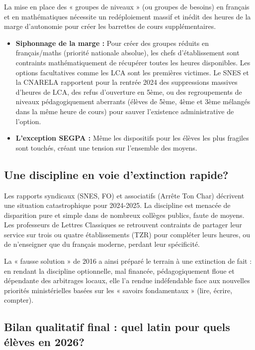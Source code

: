 La mise en place des « groupes de niveaux » (ou groupes de besoins) en français et en mathématiques
nécessite un redéploiement massif et inédit des heures de la marge d'autonomie pour créer les
barrettes de cours supplémentaires.

\begin{itemize}\item \textbf{Siphonnage de la marge :} Pour créer des groupes réduits en français/maths (priorité nationale absolue), les chefs d'établissement sont contraints mathématiquement de récupérer toutes les heures disponibles. Les options facultatives comme les LCA sont les premières victimes. Le SNES et la CNARELA rapportent pour la rentrée 2024 des suppressions massives d'heures de LCA, des refus d'ouverture en 5ème, ou des regroupements de niveaux pédagogiquement aberrants (élèves de 5ème, 4ème et 3ème mélangés dans la même heure de cours) pour sauver l'existence administrative de l'option.\cite{I-3-2-ref2}\item \textbf{L'exception SEGPA :} Même les dispositifs pour les élèves les plus fragiles sont touchés, créant une tension sur l'ensemble des moyens.\cite{I-3-2-ref39}\end{itemize}

\subsection{Une discipline en voie d'extinction rapide?}

Les rapports syndicaux (SNES, FO) et associatifs (Arrête Ton Char) décrivent une situation
catastrophique pour 2024-2025. La discipline est menacée de disparition pure et simple dans de
nombreux collèges publics, faute de moyens. Les professeurs de Lettres Classiques se retrouvent
contraints de partager leur service sur trois ou quatre établissements (TZR) pour compléter leurs
heures, ou de n'enseigner que du français moderne, perdant leur spécificité.\cite{I-3-2-ref2}

La « fausse solution » de 2016 a ainsi préparé le terrain à une extinction de fait : en rendant la
discipline optionnelle, mal financée, pédagogiquement floue et dépendante des arbitrages locaux,
elle l'a rendue indéfendable face aux nouvelles priorités ministérielles basées sur les « savoirs
fondamentaux » (lire, écrire, compter).



\subsection{Bilan qualitatif final : quel latin pour quels élèves en 2026?}

